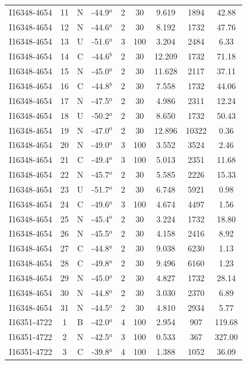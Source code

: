 \begin{table}
\begin{tabular}{ccccccccc}
I16348-4654 & 11 & N & -44.9$^{a}$ & 2 & 30 & 9.619 & 1894 & 42.88 \\
I16348-4654 & 12 & N & -44.6$^{a}$ & 2 & 30 & 8.192 & 1732 & 47.76 \\
I16348-4654 & 13 & U & -51.6$^{a}$ & 3 & 100 & 3.204 & 2484 & 6.33 \\
I16348-4654 & 14 & C & -44.6$^{b}$ & 2 & 30 & 12.209 & 1732 & 71.18 \\
I16348-4654 & 15 & N & -45.0$^{a}$ & 2 & 30 & 11.628 & 2117 & 37.11 \\
I16348-4654 & 16 & C & -44.8$^{b}$ & 2 & 30 & 7.558 & 1732 & 44.06 \\
I16348-4654 & 17 & N & -47.5$^{a}$ & 2 & 30 & 4.986 & 2311 & 12.24 \\
I16348-4654 & 18 & U & -50.2$^{a}$ & 2 & 30 & 8.650 & 1732 & 50.43 \\
I16348-4654 & 19 & N & -47.0$^{a}$ & 2 & 30 & 12.896 & 10322 & 0.36 \\
I16348-4654 & 20 & N & -49.0$^{a}$ & 3 & 100 & 3.552 & 3524 & 2.46 \\
I16348-4654 & 21 & C & -49.4$^{a}$ & 3 & 100 & 5.013 & 2351 & 11.68 \\
I16348-4654 & 22 & N & -45.7$^{a}$ & 2 & 30 & 5.585 & 2226 & 15.33 \\
I16348-4654 & 23 & U & -51.7$^{a}$ & 2 & 30 & 6.748 & 5921 & 0.98 \\
I16348-4654 & 24 & C & -49.6$^{a}$ & 3 & 100 & 4.674 & 4497 & 1.56 \\
I16348-4654 & 25 & N & -45.4$^{a}$ & 2 & 30 & 3.224 & 1732 & 18.80 \\
I16348-4654 & 26 & N & -45.5$^{a}$ & 2 & 30 & 4.158 & 2416 & 8.92 \\
I16348-4654 & 27 & C & -44.8$^{a}$ & 2 & 30 & 9.038 & 6230 & 1.13 \\
I16348-4654 & 28 & C & -49.8$^{a}$ & 2 & 30 & 9.496 & 6160 & 1.23 \\
I16348-4654 & 29 & N & -45.0$^{a}$ & 2 & 30 & 4.827 & 1732 & 28.14 \\
I16348-4654 & 30 & N & -44.8$^{a}$ & 2 & 30 & 3.030 & 2370 & 6.89 \\
I16348-4654 & 31 & N & -44.5$^{a}$ & 2 & 30 & 4.810 & 2934 & 5.77 \\
I16351-4722 & 1 & B & -42.0$^{a}$ & 4 & 100 & 2.954 & 907 & 119.68 \\
I16351-4722 & 2 & N & -42.5$^{a}$ & 3 & 100 & 0.533 & 367 & 327.00 \\
I16351-4722 & 3 & C & -39.8$^{a}$ & 4 & 100 & 1.388 & 1052 & 36.09 \\

\end{tabular}
\end{table}
